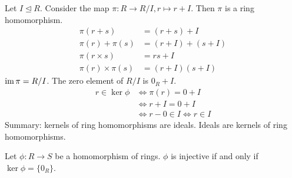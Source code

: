 \documentclass[class=article,crop=false]{standalone}
\begin{document}
\begin{eg}[]

Let $ I \trianglelefteq R$. Consider the map $ \pi: R \to R /I, r \mapsto r+I$. Then $ \pi$ is a ring homomorphism.
\begin{align*}
	\pi(r+s) &= (r+s)+I\\
	\pi(r)+\pi(s) &= (r+I)+ (s+I) \\
	\pi(r\times s)&= rs+ I \\
	\pi(r) \times \pi(s) &= (r+I) (s+I) 
\end{align*}
$ \operatorname{im} \pi= R /I$. The zero element of $ R /I$ is  $ 0_R + I$.
 \begin{align*}
	 r \in \ker \phi &\iff \pi(r) = 0+I\\
			 & \iff r+I = 0+I\\
			 & \iff r-0 \in I \iff r \in I
\end{align*}
Summary: kernels of ring homomorphisms are ideals. Ideals are kernels of ring homomorphisms.
\end{eg}

\begin{thm}[]
Let $ \phi: R \to S$ be a homomorphism of rings. $ \phi$ is injective if and only if $ \ker \phi = \{0_R\} $.
\end{thm}
\end{document}
